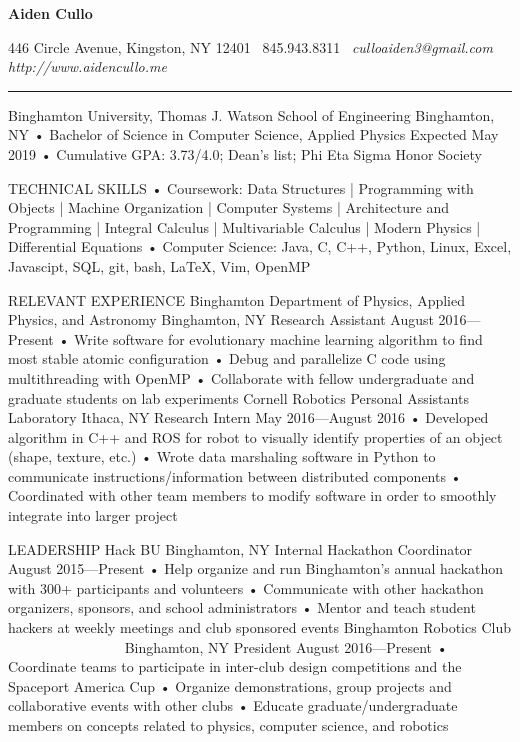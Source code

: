 \documentclass{article}
\begin{document}
\newcommand{\ts}{\textsuperscript}

\centerline{\huge \textbf{Aiden Cullo}}\newline
\centerline{\small 446 Circle Avenue, Kingston, NY 12401 \textbar \, 845.943.8311 \textbar \,  \textit{culloaiden3@gmail.com} \textbar \,  \textit{http://www.aidencullo.me}}\newline

\vspace{10mm}
\rule{\linewidth}{0.4pt}
Binghamton University, Thomas J. Watson School of Engineering 	                                                     Binghamton, NY
•	Bachelor of Science in Computer Science, Applied Physics                                                                                       Expected May 2019
•	Cumulative GPA: 3.73/4.0; Dean’s list; Phi Eta Sigma Honor Society

TECHNICAL SKILLS
•	Coursework: Data Structures | Programming with Objects | Machine Organization | Computer Systems | Architecture and Programming | Integral Calculus | Multivariable Calculus | Modern Physics | Differential Equations
•	Computer Science: Java, C, C++, Python, Linux, Excel, Javascipt, SQL, git, bash, LaTeX, Vim, OpenMP

RELEVANT EXPERIENCE
Binghamton Department of Physics, Applied Physics, and Astronomy	       	                                       Binghamton, NY
Research Assistant			   				                                                                   August 2016—Present
•	Write software for evolutionary machine learning algorithm to find most stable atomic configuration
•	Debug and parallelize C code using multithreading with OpenMP
•	Collaborate with fellow undergraduate and graduate students on lab experiments
Cornell Robotics Personal Assistants Laboratory				          		                                    Ithaca, NY
Research Intern			     	              						                  May 2016—August 2016
•	Developed algorithm in C++ and ROS for robot to visually identify properties of an object (shape, texture, etc.)
•	Wrote data marshaling software in Python to communicate instructions/information between distributed components
•	Coordinated with other team members to modify software in order to smoothly integrate into larger project

LEADERSHIP
Hack BU	        								            		            Binghamton, NY
Internal Hackathon Coordinator							                                      August 2015—Present
•	Help organize and run Binghamton’s annual hackathon with 300+ participants and volunteers
•	Communicate with other hackathon organizers, sponsors, and school administrators
•	Mentor and teach student hackers at weekly meetings and club sponsored events
Binghamton Robotics Club						                 		             Binghamton, NY
President									              	                                      August 2016—Present
•	Coordinate teams to participate in inter-club design competitions and the Spaceport America Cup
•	Organize demonstrations, group projects and collaborative events with other clubs
•	Educate graduate/undergraduate members on concepts related to physics, computer science, and robotics
\end{document}
